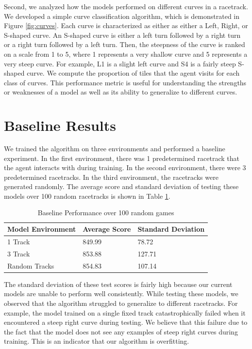 Second, we analyzed how the models performed on different curves in a racetrack. We developed a simple curve classification algorithm, which is demonstrated in Figure \ref{fig:curves}. Each curve is characterized as either as either a Left, Right, or S-shaped curve. An S-shaped curve is either a left turn followed by a right turn or a right turn followed by a left turn. Then, the steepness of the curve is ranked on a scale from 1 to 5, where 1 represents a very shallow curve and 5 represents a very steep curve. For example, L1 is a slight left curve and S4 is a fairly steep S-shaped curve. We compute the proportion of tiles that the agent visits for each class of curves. This performance metric is useful for understanding the strengths or weaknesses of a model as well as its ability to generalize to different curves.

\section{Baseline Results} \label{base}
We trained the algorithm on three environments and performed a baseline experiment. In the first environment, there was 1 predetermined racetrack that the agent interacts with during training.  In the second environment, there were 3 predetermined racetracks. In the third environment, the racetracks were generated randomly. The average score and standard deviation of testing these models over 100 random racetracks is shown in Table \ref{table:baseline_results}. 

\begin{table}[h]
\centering
\begin{tabular}{ m{4cm} | m{3cm}| m{3.5cm} } 
Model Environment & Average Score & Standard Deviation  \\
\hline 
1 Track & 849.99 & 78.72  \\
3 Track & 853.88 & 127.71  \\
Random Tracks & 854.83 & 107.14  \\
\end{tabular}
\caption{Baseline Performance over 100 random games}
\label{table:baseline_results}
\end{table}

The standard deviation of these test scores is fairly high because our current models are unable to perform well consistently. While testing these models, we observed that the algorithm struggled to generalize to different racetracks. For example, the model trained on a single fixed track catastrophically failed when it encountered a steep right curve during testing. We believe that this failure due to the fact that the model does not see any examples of steep right curves during training. This is an indicator that our algorithm is overfitting.

